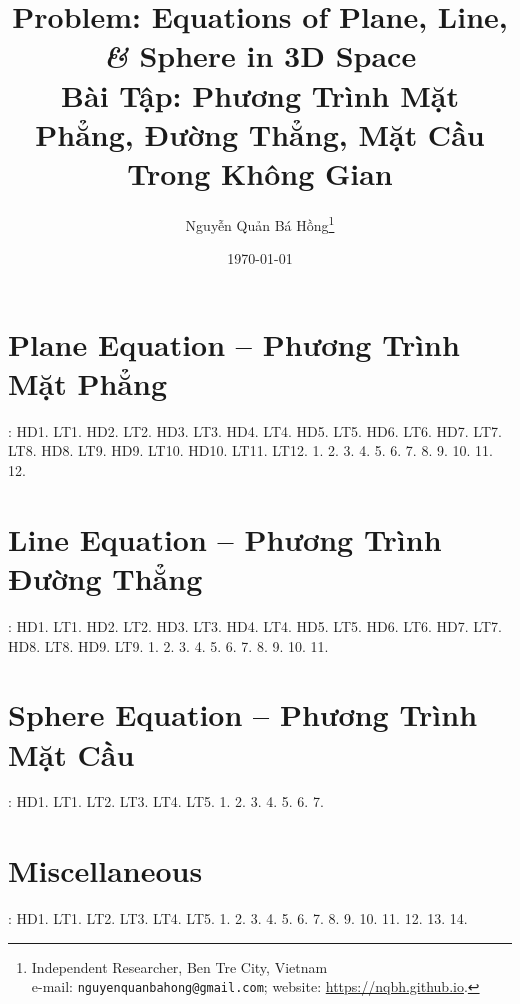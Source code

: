\documentclass{article}
\title{Problem: Equations of Plane, Line, {\it\&} Sphere in 3D Space\\Bài Tập: Phương Trình Mặt Phẳng, Đường Thẳng, Mặt Cầu Trong Không Gian}
\author{Nguyễn Quản Bá Hồng\footnote{Independent Researcher, Ben Tre City, Vietnam\\e-mail: \texttt{nguyenquanbahong@gmail.com}; website: \url{https://nqbh.github.io}.}}
\date{\today}
\begin{document}
\maketitle
\tableofcontents


\section{Plane Equation -- Phương Trình Mặt Phẳng}
\cite[Chap. V, \S1, pp. 50--64]{SGK_Toan_12_Canh_Dieu_tap_2}: HD1. LT1. HD2. LT2. HD3. LT3. HD4. LT4. HD5. LT5. HD6. LT6. HD7. LT7. LT8. HD8. LT9. HD9. LT10. HD10. LT11. LT12. 1. 2. 3. 4. 5. 6. 7. 8. 9. 10. 11. 12.


\section{Line Equation -- Phương Trình Đường Thẳng}
\cite[Chap. V, \S2, pp. 65--80]{SGK_Toan_12_Canh_Dieu_tap_2}: HD1. LT1. HD2. LT2. HD3. LT3. HD4. LT4. HD5. LT5. HD6. LT6. HD7. LT7. HD8. LT8. HD9. LT9. 1. 2. 3. 4. 5. 6. 7. 8. 9. 10. 11.


\section{Sphere Equation -- Phương Trình Mặt Cầu}
\cite[Chap. V, \S3, pp. 81--8]{SGK_Toan_12_Canh_Dieu_tap_2}: HD1. LT1. LT2. LT3. LT4. LT5. 1. 2. 3. 4. 5. 6. 7.


\section{Miscellaneous}
\cite[BTCCV, pp. 81--8]{SGK_Toan_12_Canh_Dieu_tap_2}: HD1. LT1. LT2. LT3. LT4. LT5. 1. 2. 3. 4. 5. 6. 7. 8. 9. 10. 11. 12. 13. 14.


\printbibliography[heading=bibintoc]
	
\end{document}
